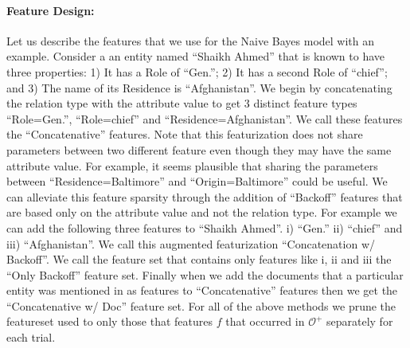 \documentclass[paper=a4,fontsize=11pt]{scrartcl}
\numberwithin{equation}{section}    %
\numberwithin{figure}{section}      %
\numberwithin{table}{section}       %
\begin{document}
\paragraph{Feature Design:}\label{sec:nb-feature-design}
Let us describe the features that we use for the Naive Bayes model with an example.
Consider a an entity named ``Shaikh Ahmed'' that is known to have three properties:
1) It has a Role of ``Gen.'';
2) It has a second Role of ``chief''; and
3) The name of its Residence is ``Afghanistan''.
We begin by concatenating the relation type with the attribute value to get 3 distinct feature types
``Role=Gen.'', ``Role=chief'' and ``Residence=Afghanistan''.
We call these features the ``Concatenative'' features.
Note that this featurization does not share parameters between two different feature even though they may have the same attribute value. For example, it seems plausible that sharing the parameters between ``Residence=Baltimore'' and ``Origin=Baltimore'' could be useful.
We can alleviate this feature sparsity through the addition of ``Backoff'' features
that are based only on the attribute value and not the relation type.
For example we can add the following three features
to ``Shaikh Ahmed''. i) ``Gen.'' ii) ``chief'' and iii) ``Afghanistan''.
We call this augmented featurization ``Concatenation w/ Backoff''.
We call the feature set that  contains only features like i, ii and iii the ``Only Backoff'' feature set.
Finally when we add the documents that a particular entity was mentioned in as features to
``Concatenative'' features then we get the ``Concatenative w/ Doc'' feature set.
For all of the above methods we prune the featureset used to only those that features $f$ that occurred in $\mathcal{O}^{+}$
separately for each trial.

\end{document}
